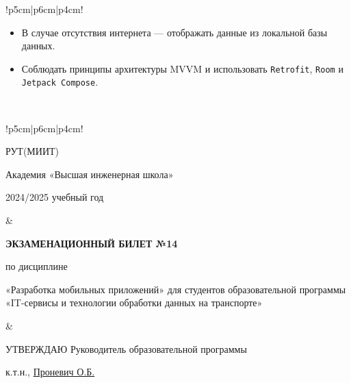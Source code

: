 \documentclass[a4paper]{article}
\begin{document}
\begin{tabular}{!{\vrule width 2pt}p{5cm}|p{6cm}|p{4cm}!{\vrule width 2pt}}
{\begin{minipage}{16cm}
\begin{enumerate}
\begin{itemize}  \item В случае отсутствия интернета — отображать данные из локальной базы данных. \item Соблюдать принципы архитектуры MVVM и использовать \texttt{Retrofit}, \texttt{Room} и \texttt{Jetpack Compose}. \end{itemize} 
\end{enumerate}

\vspace{0.2cm}
    
\end{minipage}
}
\\
\end{tabular}

\newpage


\begin{tabular}{!{\vrule width 2pt}p{5cm}|p{6cm}|p{4cm}!{\vrule width 2pt}}

    {\centering 
    \fontsize{14pt}{16pt}\selectfont
    РУТ(МИИТ)

\vspace{14pt}

Академия «Высшая инженерная школа»

\vspace{14pt}

2024/2025 учебный год

    }
&
{
    \centering
\fontsize{14pt}{16pt}\selectfont

\textbf{ЭКЗАМЕНАЦИОННЫЙ
БИЛЕТ №14}


по дисциплине 

«Разработка мобильных приложений» 
\fontsize{12pt}{14pt}\selectfont
для студентов образовательной программы «IT-сервисы и технологии обработки данных на транспорте»

}
&
{
\centering
\fontsize{14pt}{16pt}\selectfont

УТВЕРЖДАЮ
Руководитель образовательной программы

\vspace{1cm}

\fontsize{12pt}{14pt}\selectfont
\underline{\hspace{3cm}}

к.т.н., \underline{Проневич О.Б.}

}
\\
\hline
{}
\end{tabular}
\end{document}
